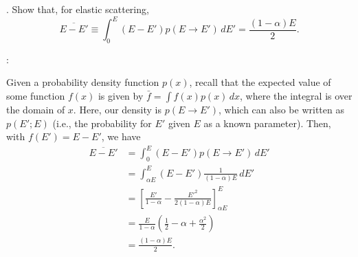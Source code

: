\newpage

. Show that, for elastic scattering,
\[
 \overline{E-E'}\equiv
 \int_0^E(E-E')p(E\to E')\,dE'
 =\frac{(1-\alpha)E}{2}.
\]

\vspace{0.5cm}
\ifsolved
{
\color{purple}

:

Given a probability density function $p(x)$, recall that the expected value
of some function $f(x)$ is given by $\bar{f}=\int f(x)p(x)\,dx$, where the
integral is over the domain of $x$. Here, our density is $p(E\to E')$, which
can also be written as $p(E';E)$ (i.e., the probability for $E'$ given $E$ as
a known parameter). Then, with $f(E')=E-E'$, we have
\begin{align*}
 \overline{E-E'}
 &=\int_0^E(E-E')p(E\to E')\,dE'\\
 &=\int_{\alpha E}^E(E-E')\frac{1}{(1-\alpha)E}\,dE'\\
 &=\left[\frac{E'}{1-\alpha}
 -\frac{E'^2}{2(1-\alpha)E}\right]_{\alpha E}^E\\
 &=\frac{E}{1-\alpha}
 \left(\frac12-\alpha+\frac{\alpha^2}{2}\right)\\
 &=\boxed{\frac{(1-\alpha)E}{2}}.
\end{align*}

}
\else
\fi

\clearpage
